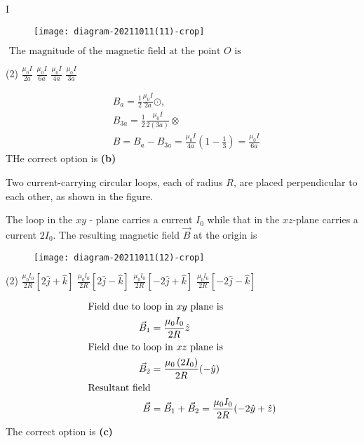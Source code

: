 \begin{enumerate}
\begin{minipage}{\textwidth}
	\item {} I \\
	\begin{figure}[H]
		\centering
		\texttt{[image: diagram-20211011(11)-crop]}
	\end{figure}
	$\text { The magnitude of the magnetic field at the point } O \text { is }$
\end{minipage}
\begin{tasks}(2)
	\task[\textbf{A.}] $\frac{\mu_{0} I}{2 a}$
	\task[\textbf{B.}]$\frac{\mu_{0} I}{6 a}$
	\task[\textbf{C.}]$\frac{\mu_{0} I}{4 a}$
	\task[\textbf{D.}]$\frac{\mu_{0} I}{3 a}$
\end{tasks}
\begin{answer}
	\begin{align*}
	& B_{a}=\frac{1}{2} \frac{\mu_{0} I}{2 a} \odot,\\
	& B_{3 a}=\frac{1}{2} \frac{\mu_{0} I}{2(3 a)} \otimes \\
	&B=B_{a}-B_{3 a}=\frac{\mu_{0} I}{4 a}\left(1-\frac{1}{3}\right)=\frac{\mu_{0} I}{6 a}
	\end{align*}
	THe correct option is \textbf{(b)}	
\end{answer}
\begin{minipage}{\textwidth}
	\item Two current-carrying circular loops, each of radius $R$, are placed perpendicular to each other, as shown in the figure.
	
	The loop in the $x y$ - plane carries a current $I_{0}$ while that in the $x z$-plane carries a current $2 I_{0}$. The resulting magnetic field $\vec{B}$ at the origin is
	\begin{figure}[H]
		\centering
		\texttt{[image: diagram-20211011(12)-crop]}
	\end{figure}
\end{minipage}
\begin{tasks}(2)
	\task[\textbf{A.}] $\frac{\mu_{0} l_{0}}{2 R}[2 \hat{j}+\hat{k}]$ 
	\task[\textbf{B.}]$\frac{\mu_{0} l_{0}}{2 R}[2 \hat{j}-\hat{k}]$
	\task[\textbf{C.}]$\frac{\mu_{0} l_{0}}{2 R}[-2 \hat{j}+\hat{k}]$
	\task[\textbf{D.}]$\frac{\mu_{0} l_{0}}{2 R}[-2 \hat{j}-\hat{k}]$
\end{tasks}
\begin{answer}
	\begin{align*}
	\intertext{Field due to loop in $x y$ plane is} 
	\vec{B}_{1}&=\frac{\mu_{0} I_{0}}{2 R} \hat{z}\\
	\intertext{Field due to loop in $x z$ plane is}
	\vec{B}_{2}&=\frac{\mu_{0}\left(2 I_{0}\right)}{2 R}(-\hat{y})\\
	\text{Resultant field}\\
	 \vec{B}&=\vec{B}_{1}+\vec{B}_{2}=\frac{\mu_{0} I_{0}}{2 R}(-2 \hat{y}+\hat{z})
	\end{align*}
	The correct option is \textbf{(c)}	
\end{answer}
\end{enumerate}
